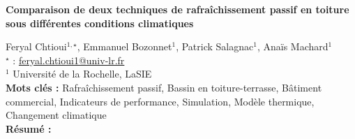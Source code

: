 


    \newpage


%
\begin{flushleft}
\addtocounter{section}{1}
{\Large \textbf{Comparaison de deux techniques de rafraîchissement passif en toiture sous différentes conditions climatiques}}\label{ref:10}
\end{flushleft}
%
Feryal Chtioui$^{1,\star}$, Emmanuel Bozonnet$^{1}$, Patrick Salagnac$^{1}$, Anaïs Machard$^{1}$\\[2mm]
$^{\star}$ \Letter : \url{feryal.chtioui1@univ-lr.fr}\\[2mm]
{\footnotesize $^{1}$ Université de la Rochelle, LaSIE}\\
[4mm]
%
\noindent \textbf{Mots clés : } Rafraîchissement passif, Bassin en toiture-terrasse, Bâtiment commercial, Indicateurs de performance, Simulation, Modèle thermique, Changement climatique\\[4mm]
%
\noindent \textbf{Résumé : } 

